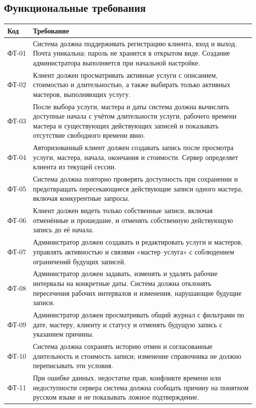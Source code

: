 \subsection{Функциональные требования}
\begin{longtable}{L{1.6cm}L{13.2cm}}
\toprule Код & Требование \\ \midrule
\endhead
ФТ-01 & Система должна поддерживать регистрацию клиента, вход и выход. Почта уникальна; пароль не хранится в открытом виде. Создание администратора выполняется при начальной настройке. \\
ФТ-02 & Клиент должен просматривать активные услуги с описанием, стоимостью и длительностью, а также выбирать только активных мастеров, выполняющих услугу. \\
ФТ-03 & После выбора услуги, мастера и даты система должна вычислять доступные начала с учётом длительности услуги, рабочего времени мастера и существующих действующих записей и показывать отсутствие свободного времени явно. \\
ФТ-04 & Авторизованный клиент должен создавать запись после просмотра услуги, мастера, начала, окончания и стоимости. Сервер определяет клиента из текущей сессии. \\
ФТ-05 & Система должна повторно проверять доступность при сохранении и предотвращать пересекающиеся действующие записи одного мастера, включая конкурентные запросы. \\
ФТ-06 & Клиент должен видеть только собственные записи, включая отменённые и прошедшие, и отменять собственную действующую запись до её начала. \\
ФТ-07 & Администратор должен создавать и редактировать услуги и мастеров, управлять активностью и связями «мастер--услуга» с соблюдением ограничений будущих записей. \\
ФТ-08 & Администратор должен задавать, изменять и удалять рабочие интервалы на конкретные даты. Система должна отклонять пересечения рабочих интервалов и изменения, нарушающие будущие записи. \\
ФТ-09 & Администратор должен просматривать общий журнал с фильтрами по дате, мастеру, клиенту и статусу и отменять будущую запись с указанием причины. \\
ФТ-10 & Система должна сохранять историю отмен и согласованные длительность и стоимость записи; изменение справочника не должно переписывать эти условия. \\
ФТ-11 & При ошибке данных, недостатке прав, конфликте времени или недоступности сервера система должна сообщать причину на понятном русском языке и не показывать ложное подтверждение. \\
\bottomrule
\end{longtable}

